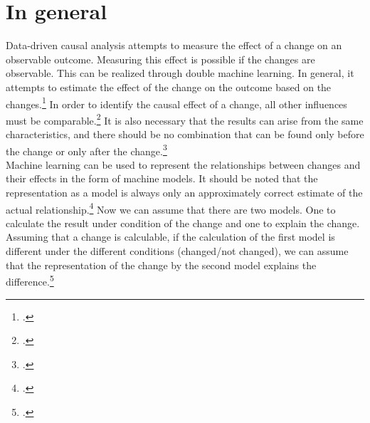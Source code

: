     \section{In general}
    Data-driven causal analysis attempts to measure the effect of a change on an observable outcome. Measuring this effect is possible if the changes are observable. This can be realized through double machine learning. In general, it attempts to estimate the effect of the change on the outcome based on the changes.\footcite[see][106]{mahu2020} In order to identify the causal effect of a change, all other influences must be comparable.\footcite[see][107]{mahu2020} It is also necessary that the results can arise from the same characteristics, and there should be no combination that can be found only before the change or only after the change.\footcite[see][109]{mahu2020}\\
    Machine learning can be used to represent the relationships between changes and their effects in the form of machine models. It should be noted that the representation as a model is always only an approximately correct estimate of the actual relationship.\footcite[see][111]{mahu2020} Now we can assume that there are two models. One to calculate the result under condition of the change and one to explain the change. Assuming that a change is calculable, if the calculation of the first model is different under the different conditions (changed/not changed), we can assume that the representation of the change by the second model explains the difference.\footcite[see][112\psqq]{mahu2020}

